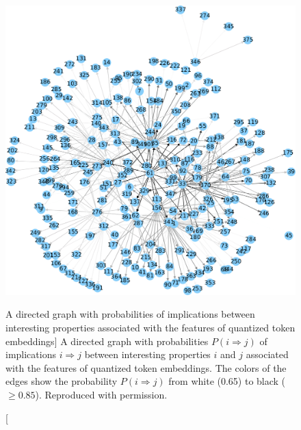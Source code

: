 \begin{figure}
\includegraphics{word2bits-implications}
\vspace{-0.5cm}
\caption
  [A directed graph with probabilities of implications between interesting
   properties associated with the features of quantized token embeddings]%
  {A directed graph with probabilities $P(i ⇒ j)$ of implications $i ⇒ j$
   between interesting properties $i$ and $j$ associated with the features
   of quantized token embeddings. The colors of the edges show the probability
   $P(i ⇒ j)$ from white (0.65) to black ($≥ 0.85$).
   Reproduced with permission. \cite[Figure B.1]{stefanik2019semantic}}
\label{fig:formal-concept-analysis-with-quantized-token-embeddings}
\end{figure}
